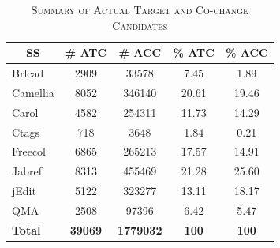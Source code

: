 \documentclass[review]{elsarticle}
\begin{document}
\begin{table}[htbp]
\centering
\caption{\label{tab:summary-atc-acc}\textsc{Summary of Actual Target and Co-change Candidates}}
\begin{tabular}{lcccc}
\hline
\multicolumn{1}{|c|}{\textbf{SS}}    & \multicolumn{1}{c|}{\textbf{\# ATC}} & \multicolumn{1}{c|}{\textbf{\# ACC}}  & \multicolumn{1}{c|}{\textbf{\% ATC}} & \multicolumn{1}{c|}{\textbf{\% ACC}} \\ \hline \hline
\multicolumn{1}{|l|}{Brlcad}         & \multicolumn{1}{c|}{2909}            & \multicolumn{1}{c|}{33578}            & \multicolumn{1}{c|}{7.45}            & \multicolumn{1}{c|}{1.89}            \\ \hline
\multicolumn{1}{|l|}{Camellia}       & \multicolumn{1}{c|}{8052}            & \multicolumn{1}{c|}{346140}           & \multicolumn{1}{c|}{20.61}           & \multicolumn{1}{c|}{19.46}           \\ \hline
\multicolumn{1}{|l|}{Carol}          & \multicolumn{1}{c|}{4582}            & \multicolumn{1}{c|}{254311}           & \multicolumn{1}{c|}{11.73}           & \multicolumn{1}{c|}{14.29}           \\ \hline
\multicolumn{1}{|l|}{Ctags}          & \multicolumn{1}{c|}{718}             & \multicolumn{1}{c|}{3648}             & \multicolumn{1}{c|}{1.84}            & \multicolumn{1}{c|}{0.21}            \\ \hline
\multicolumn{1}{|l|}{Freecol}        & \multicolumn{1}{c|}{6865}            & \multicolumn{1}{c|}{265213}           & \multicolumn{1}{c|}{17.57}           & \multicolumn{1}{c|}{14.91}           \\ \hline
\multicolumn{1}{|l|}{Jabref}         & \multicolumn{1}{c|}{8313}            & \multicolumn{1}{c|}{455469}           & \multicolumn{1}{c|}{21.28}           & \multicolumn{1}{c|}{25.60}           \\ \hline
\multicolumn{1}{|l|}{jEdit}          & \multicolumn{1}{c|}{5122}            & \multicolumn{1}{c|}{323277}           & \multicolumn{1}{c|}{13.11}           & \multicolumn{1}{c|}{18.17}           \\ \hline
\multicolumn{1}{|l|}{QMA}            & \multicolumn{1}{c|}{2508}            & \multicolumn{1}{c|}{97396}            & \multicolumn{1}{c|}{6.42}            & \multicolumn{1}{c|}{5.47}            \\ \hline
\multicolumn{1}{|l|}{\textbf{Total}} & \multicolumn{1}{c|}{\textbf{39069}}  & \multicolumn{1}{c|}{\textbf{1779032}} & \multicolumn{1}{c|}{\textbf{100}} & \multicolumn{1}{c|}{\textbf{100}} \\ \hline

\end{tabular}
\end{table}
\end{document}
